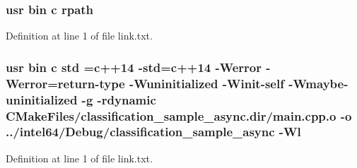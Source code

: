 \subsubsection[{\texorpdfstring{rpath}{rpath}}]{\setlength{\rightskip}{0pt plus 5cm}usr bin {\bf c} rpath}\hypertarget{classification__sample__async_2CMakeFiles_2classification__sample__async_8dir_2link_8txt_ab9d7fd7120fafa2118a4e08c1df697c7}{}\label{classification__sample__async_2CMakeFiles_2classification__sample__async_8dir_2link_8txt_ab9d7fd7120fafa2118a4e08c1df697c7}


Definition at line 1 of file link.\+txt.

\subsubsection[{\texorpdfstring{std}{std}}]{\setlength{\rightskip}{0pt plus 5cm}usr bin {\bf c} std ={\bf c}++14 -\/std={\bf c}++14 -\/Werror -\/Werror=return-\/type -\/Wuninitialized -\/Winit-\/self -\/Wmaybe-\/uninitialized -\/g -\/rdynamic C\+Make\+Files/classification\+\_\+sample\+\_\+async.\+dir/main.\+cpp.\+o -\/o ../intel64/Debug/classification\+\_\+sample\+\_\+async -\/{\bf Wl}}\hypertarget{classification__sample__async_2CMakeFiles_2classification__sample__async_8dir_2link_8txt_a1ccfea5f558575a112db71eeb271fabf}{}\label{classification__sample__async_2CMakeFiles_2classification__sample__async_8dir_2link_8txt_a1ccfea5f558575a112db71eeb271fabf}


Definition at line 1 of file link.\+txt.

